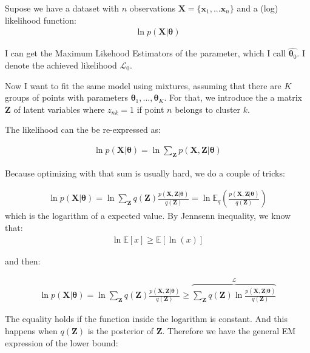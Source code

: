 \documentclass[10pt,a4paper]{article}
\author{Alberto Lumbreras}
\begin{document}
Supose we have a dataset with $n$ observations $\mathbf{X} = \{\mathbf{x}_1,...\mathbf{x}_n\}$ and a (log) likelihood function:
\begin{align}
\ln p(\mathbf{X} | \boldsymbol{\theta})
\end{align}

I can get the Maximum Likehood Estimators of the parameter, which I call $\hat{\boldsymbol{\theta}_0}$. I denote the achieved likelihood $\mathcal{L}_0$.

Now I want to fit the same model using mixtures, assuming that there are $K$ groups of points with parameters $\boldsymbol{\theta}_1, ..., \boldsymbol{\theta}_K$. For that, we introduce the a matrix $\mathbf{Z}$ of latent variables where $z_{nk}=1$ if point $n$ belongs to cluster $k$.

The likelihood can the be re-expressed as:

\begin{align*}
\ln p(\mathbf{X} | \boldsymbol{\theta}) = \ln \sum_{\mathbf{Z}} p(\mathbf{X}, \mathbf{Z} | \boldsymbol{\theta})
\end{align*}

Because optimizing with that sum is usually hard, we do a couple of tricks:

\begin{align*}
\ln p(\mathbf{X} | \boldsymbol{\theta}) 
= 
\ln  
\sum_{\mathbf{Z}} q(\mathbf{Z})
\frac{ p(\mathbf{X}, \mathbf{Z} | \boldsymbol{\theta})}{q(\mathbf{Z})}
=
\ln
\mathbb{E}_q\left(
\frac{ p(\mathbf{X}, \mathbf{Z} | \boldsymbol{\theta})}{q(\mathbf{Z})}
\right)
\end{align*}
which is the logarithm of a expected value. By Jennsenn inequality, we know that:
\begin{align*}
\ln \mathbb{E}[x] \geq \mathbb{E}[\ln (x)]
\end{align*}

and then:

\begin{align*}
\ln p(\mathbf{X} | \boldsymbol{\theta}) 
= 
\ln  
\sum_{\mathbf{Z}} q(\mathbf{Z})
\frac{ p(\mathbf{X}, \mathbf{Z} | \boldsymbol{\theta})}{q(\mathbf{Z})}
\geq
\overbrace{
\sum_{\mathbf{Z}} q(\mathbf{Z})
\ln \frac{ p(\mathbf{X}, \mathbf{Z} | \boldsymbol{\theta})}{q(\mathbf{Z})}
}^{\mathcal{L}}
\end{align*}

The equality holds if the function inside the logarithm is constant. And this happens when $q(\mathbf{Z})$ is the posterior of $\mathbf{Z}$. Therefore we have the general EM expression of the lower bound:
\end{document}
